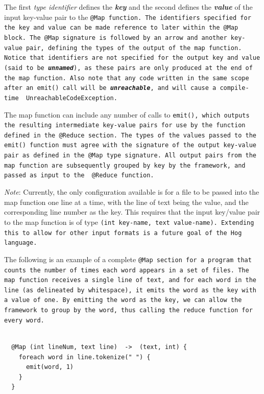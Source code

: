 \documentclass{article}
\begin{document}
The first \emph{type identifier} defines the \emph{\textbf{key}} and the second defines the \emph{\textbf{value}} of the input
key-value pair to the \tt @Map \rm function. The identifiers specified for the key and value can be made reference to later
within the \tt @Map \rm block. The \tt @Map \rm signature is followed by an arrow and another key-value pair, defining the
types of the output of the map function. Notice that identifiers are not specified for the output key and value (said to be
\emph{\textbf{unnamed}}), as these pairs are only produced at the end of the map function. Also note that any code written in
the same scope after an \tt emit() \rm call will be \textbf{\emph{unreachable}}, and will cause a compile-time \tt
UnreachableCodeException\rm.

The map function can include any number of calls to \tt emit()\rm, which outputs
the resulting intermediate key-value pairs for use by the function defined in the
\tt @Reduce \rm section. The types of the values passed to the \tt emit() \rm
function must agree with the signature of the output key-value pair as defined in
the \tt @Map \rm type signature. All output pairs from the map function are
subsequently grouped by key by the framework, and passed as input to the \tt
@Reduce \rm function.

\emph{Note}: Currently, the only configuration available is for a file to be passed into the map
function one line at a time, with the line of text being the value, and the
corresponding line number as the key. This requires that the input key/value pair
to the map function is of type \tt (int key‐name, text value‐name)\rm. Extending
this to allow for other input formats is a future goal of the Hog language.

The following is an example of a complete \tt @Map \rm section for a program that
counts the number of times each word appears in a set of files. The map function
receives a single line of text, and for each word in the line (as delineated by
whitespace), it emits the word as the key with a value of one. By emitting the word
as the key, we can allow the framework to group by the word, thus calling the
reduce function for every word.

\begin{verbatim}

  @Map (int lineNum, text line)  ->  (text, int) {
    foreach word in line.tokenize(" ") {
      emit(word, 1)
    }
  }

\end{verbatim}
\end{document}
